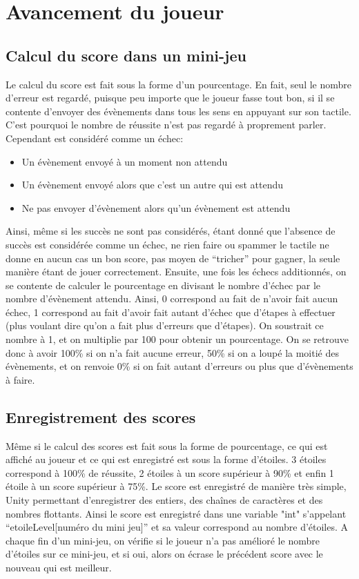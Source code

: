 \section{Avancement du joueur}

\subsection{Calcul du score dans un mini-jeu}

Le calcul du score est fait sous la forme d'un pourcentage. En fait, seul le nombre d'erreur est regardé, puisque peu importe que le joueur fasse tout bon, si il se contente d'envoyer des évènements dans tous les sens en appuyant sur son tactile. C'est pourquoi le nombre de réussite n'est pas regardé à proprement parler. Cependant est considéré comme un échec:
\begin{itemize}
\item Un évènement envoyé à un moment non attendu
\item Un évènement envoyé alors que c'est un autre qui est attendu
\item Ne pas envoyer d'évènement alors qu'un évènement est attendu
\end{itemize}
Ainsi, même si les succès ne sont pas considérés, étant donné que l'absence de succès est considérée comme un échec, ne rien faire ou spammer le tactile ne donne en aucun cas un bon score, pas moyen de “tricher” pour gagner, la seule manière étant de jouer correctement.
Ensuite, une fois les échecs additionnés, on se contente de calculer le pourcentage en divisant le nombre d'échec par le nombre d'évènement attendu. Ainsi, 0 correspond au fait de n'avoir fait aucun échec, 1 correspond au fait d'avoir fait autant d'échec que d'étapes à effectuer (plus voulant dire qu'on a fait plus d'erreurs que d'étapes). On soustrait ce nombre à 1, et on multiplie par 100 pour obtenir un pourcentage. On se retrouve donc à avoir 100\% si on n'a fait aucune erreur, 50\% si on a loupé la moitié des évènements, et on renvoie 0\% si on fait autant d'erreurs ou plus que d'évènements à faire. 

\subsection{Enregistrement des scores}

Même si le calcul des scores est fait sous la forme de pourcentage, ce qui est affiché au joueur et ce qui est enregistré est sous la forme d'étoiles. 3 étoiles correspond à 100\% de réussite, 2 étoiles à un score supérieur à 90\% et enfin 1 étoile à un score supérieur à 75\%. Le score est enregistré de manière très simple, Unity permettant d'enregistrer des entiers, des chaînes de caractères et des nombres flottants. Ainsi le score est enregistré dans une variable "int" s'appelant “etoileLevel[numéro du mini jeu]” et sa valeur correspond au nombre d'étoiles. A chaque fin d'un mini-jeu, on vérifie si le joueur n'a pas amélioré le nombre d'étoiles sur ce mini-jeu, et si oui, alors on écrase le précédent score avec le nouveau qui est meilleur.

